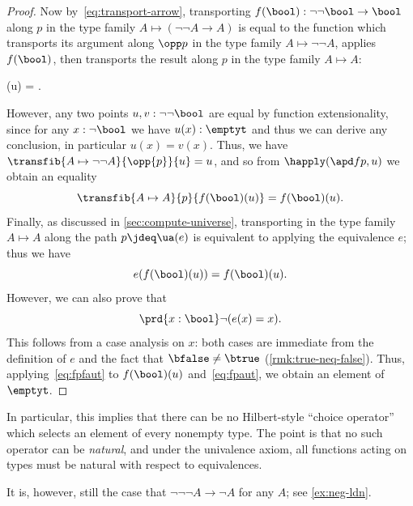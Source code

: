 \begin{proof}
  Now by~\eqref{eq:transport-arrow}, transporting $f(\bool):\neg\neg\bool\to\bool$ along $p$ in the type family ${A\mapsto (\neg\neg A \to A)}$ is equal to the function which transports its argument along $\opp p$ in the type family $A\mapsto \neg\neg A$, applies $f(\bool)$, then transports the result along $p$ in the type family $A\mapsto A$:
  \begin{narrowmultline*}
    (u) =
    \narrowbreak
    .
  \end{narrowmultline*}
  However, any two points $u,v:\neg\neg\bool$ are equal by function extensionality, since for any $x:\neg\bool$ we have $u(x):\emptyt$ and thus we can derive any conclusion, in particular $u(x)=v(x)$.
  Thus, we have $\transfib{A\mapsto \neg\neg A}{\opp{p}}{u} = u$, and so from $\happly(\apd f p,u)$ we obtain an equality
  \[ \transfib{A\mapsto A}{p}{f(\bool)(u)} = f(\bool)(u).\]
  Finally, as discussed in \cref{sec:compute-universe}, transporting in the type family $A\mapsto A$ along the path $p\jdeq \ua(e)$ is equivalent to applying the equivalence $e$; thus we have
  \begin{equation}
    e(f(\bool)(u)) = f(\bool)(u).\label{eq:fpaut}
  \end{equation}
  However, we can also prove that
  \begin{equation}
    \prd{x:\bool} \neg(e(x)=x).\label{eq:fpfaut}
  \end{equation}
  This follows from a case analysis on $x$: both cases are immediate from the definition of $e$ and the fact that $\bfalse\neq\btrue$ (\cref{rmk:true-neq-false}).
  Thus, applying~\eqref{eq:fpfaut} to $f(\bool)(u)$ and~\eqref{eq:fpaut}, we obtain an element of $\emptyt$.
\end{proof}

\begin{rmk}
  In particular, this implies that there can be no Hilbert-style ``choice operator'' which selects an element of every nonempty type.
  The point is that no such operator can be \emph{natural}, and under the univalence axiom, all functions acting on types must be natural with respect to equivalences.
\end{rmk}

\begin{rmk}
  It is, however, still the case that $\neg\neg\neg A \to \neg A$ for any $A$; see \cref{ex:neg-ldn}.
\end{rmk}


